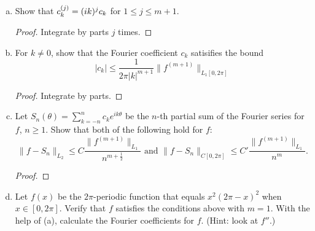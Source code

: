 \documentclass{article}
\begin{document}
\begin{enumerate}[(a)]
\item Show that $c_k^{(j)} = (ik)^j c_k$ for $1 \le j \le m+1$.

\begin{proof}
Integrate by parts $j$ times.
\end{proof}

\item For $k \neq 0$, show that the Fourier coefficient $c_k$ satisifies the bound
$$ | c_k | \le \frac 1 {2 \pi |k|^{m+1}} \|f^{(m+1)}\|_{L_1[0,2\pi]}$$

\begin{proof}
Integrate by parts.
\end{proof}

\item Let $S_n(\theta) = \sum_{k=-n}^n c_k e^{ik\theta}$ be the $n$-th partial sum of the Fourier series for $f$, $n \ge 1$. Show that both of the following hold for $f$:
$$\|f - S_n \|_{L_2} \le C \frac{\|f^{(m+1)}\|_{L_1}} {n^{m + \frac 1 2}} \text{ and }  \|f - S_n\|_{C[0,2\pi]} \le C' \frac{\|f^{(m+1)}\|_{L_1}}{n^m}.$$
\begin{proof}

\end{proof}


\item Let $f(x)$ be the $2\pi$-periodic function that equals $x^2(2 \pi - x)^2$ when $x \in [0,2 \pi]$. Verify that $f$ satisfies the conditions above with $m = 1$. With the help of (a), calculate the Fourier coefficients for $f$. (Hint: look at $f''$.)



\end{enumerate}
\end{document}
